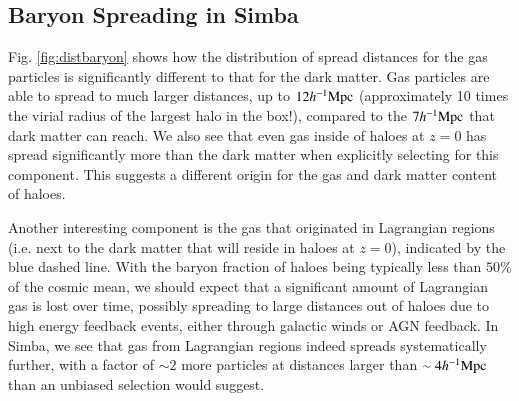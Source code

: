 \documentclass[fleqn,usenatbib]{mnras}
\newcommand{\hmpc}{h^{-1}{\rm Mpc}}
\newcommand{\simba}{{\sc Simba}}
\begin{document}
\subsection{Baryon Spreading in \simba{}}


Fig. \ref{fig:distbaryon} shows how the distribution of spread distances
for the gas particles is significantly different to that for the dark matter.
Gas particles are able to spread to much larger distances, up to $12\hmpc{}$
(approximately 10 times the virial radius of the largest halo in the box!),
compared to the $7\hmpc{}$ that dark matter can reach. We also see that even
gas inside of haloes at $z=0$ has spread significantly more than the dark
matter when explicitly selecting for this component. This suggests a
different origin for the gas and dark matter content of haloes.

Another interesting component is the gas that originated in Lagrangian
regions (i.e. next to the dark matter that will reside in haloes at $z=0$),
indicated by the blue dashed line. With the baryon fraction of haloes being
typically less than $50\%$ of the cosmic mean, we should expect that a
significant amount of Lagrangian gas is lost over time, possibly spreading to
large distances out of haloes due to high energy feedback events, either
through galactic winds or AGN feedback. In \simba{}, we see that gas from
Lagrangian regions indeed spreads systematically further, with a factor of
$\sim 2$ more particles at distances larger than $\sim 4 \hmpc{}$ than an
unbiased selection would suggest.
\end{document}
